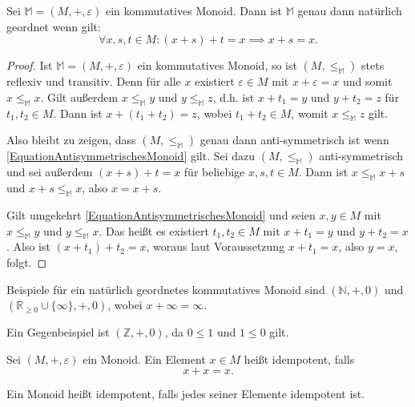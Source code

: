 \documentclass{article}
\begin{document}
\begin{theorem}
  Sei $\mathbb{M} = (M, +, \varepsilon)$ ein kommutatives Monoid.
  Dann ist $\mathbb{M}$ genau dann natürlich geordnet wenn gilt:
  \begin{equation*} \label{EquationAntisymmetrischesMonoid}
    \forall x,s,t \in M \colon (x + s) + t = x \implies x + s = x.\tag{$\ast$}
  \end{equation*}
\end{theorem}
\begin{proof}
  Ist $\mathbb{M} = (M, +, \varepsilon)$ ein kommutatives Monoid, so ist $(M, \leq_\mathbb{M})$ stets reflexiv und transitiv.
  Denn für alle $x$ existiert $\varepsilon \in M$ mit $x + \varepsilon = x$ und somit $x \leq_\mathbb{M} x$.
  Gilt außerdem $x \leq_\mathbb{M} y$ und $y \leq_\mathbb{M} z$, d.h. ist $x + t_1 = y$ und $y + t_2 = z$ für $t_1, t_2 \in M$. 
  Dann ist $x + (t_1 + t_2) = z$, wobei $t_1 + t_2 \in M$, womit $x \leq_\mathbb{M} z$ gilt.

  Also bleibt zu zeigen, dass $(M, \leq_\mathbb{M})$ genau dann anti-symmetrisch ist wenn \eqref{EquationAntisymmetrischesMonoid} gilt.
  Sei dazu $(M, \leq_\mathbb{M})$ anti-symmetrisch und sei außerdem $(x + s) + t = x$ für beliebige $x,s,t \in M$.
  Dann ist $x \leq_\mathbb{M} x+ s$ und $x + s \leq_\mathbb{M} x$, also $x = x + s$.

  Gilt umgekehrt \eqref{EquationAntisymmetrischesMonoid} und seien $x,y \in M$ mit $x \leq_\mathbb{M} y$ und $y \leq_\mathbb{M} x$.
  Das heißt es existiert $t_1, t_2 \in M$ mit $x + t_1 = y$ und $y + t_2 = x$.
  Also ist $(x + t_1) + t_2 = x$, woraus laut Voraussetzung $x + t_1 = x$, also $y = x$, folgt.
\end{proof}

\begin{example}
  Beispiele für ein natürlich geordnetes kommutatives Monoid sind $(\mathbb{N}, +, 0)$ und $(\mathbb{R}_{\geq 0} \cup \{\infty\}, +, 0)$, wobei
  $x + \infty = \infty$.

  Ein Gegenbeispiel ist $(\mathbb{Z}, +, 0)$, da $0 \leq 1$ und $1 \leq 0$ gilt.
\end{example}

\begin{definition}
  Sei $(M, +, \varepsilon)$ ein Monoid. 
  Ein Element $x \in M$ heißt idempotent, falls
  \begin{equation*}
    x + x = x.
  \end{equation*}
  
  Ein Monoid heißt idempotent, falls jedes seiner Elemente idempotent ist.
\end{definition}
\end{document}

